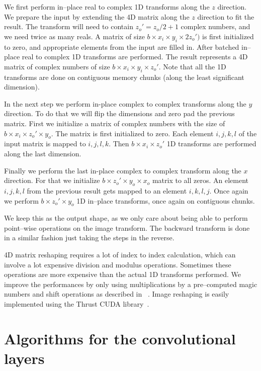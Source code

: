 \documentclass[conference]{IEEEtran}
\begin{document}
We first perform in--place real to complex 1D transforms along the $z$
direction. We prepare the input by extending the 4D matrix along the
$z$ direction to fit the result.  The transform will need to contain
$z_o' = z_o / 2 + 1$ complex numbers, and we need twice as many reals.
A matrix of size $b \times x_i \times y_i \times 2z_o')$ is first
initialized to zero, and appropriate elements from the input are
filled in.  After batched in--place real to complex 1D transforms are
performed.  The result represents a 4D matrix of complex numbers of
size $b \times x_i \times y_i \times z_o'$.  Note that all the 1D
transforms are done on contiguous memory chunks (along the least
significant dimension).

In the next step we perform in-place complex to complex transforms
along the $y$ direction.  To do that we will flip the dimensions and
zero pad the previous matrix.  First we initialize a matrix of complex
numbers with the size of $b \times x_i \times z_o' \times y_o$.  The
matrix is first initialized to zero.  Each element $i,j,k,l$ of the
input matrix is mapped to $i,j,l,k$.  Then $b \times x_i \times z_o'$
1D transforms are performed along the last dimension.

Finally we perform the last in-place complex to complex transform
along the $x$ direction.  For that we initialize $b \times z_o' \times
y_o \times x_o$ matrix to all zeros.  An element $i,j,k,l$ from the
previous result gets mapped to an element $i,k,l,j$.  Once again we
perform $b \times z_o' \times y_o$ 1D in--place transforms, once again
on contiguous chunks.

We keep this as the output shape, as we only care about being able to
perform point--wise operations on the image transform.  The backward
transform is done in a similar fashion just taking the steps in the
reverse.

4D matrix reshaping requires a lot of index to index calculation,
which can involve a lot expensive division and modulus operations.
Sometimes these operations are more expensive than the actual 1D
transforms performed.  We improve the performances by only using
multiplications by a pre--computed magic numbers and shift operations
as described in ~\cite{warren2013hacker}.  Image reshaping is easily
implemented using the Thrust CUDA library~\cite{bell2011thrust}.

\section{Algorithms for the convolutional layers}
\end{document}
